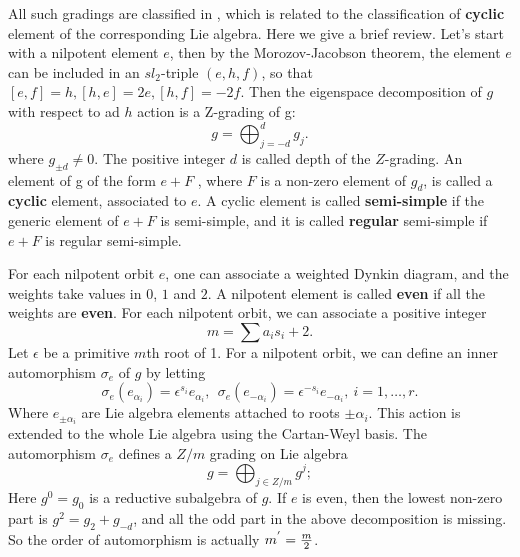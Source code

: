 \documentclass[a4paper,11pt]{article}
\begin{document}
All such gradings are classified in \cite{elashvili2013cyclic}, which is 
related to the classification of \textbf{cyclic} element of the corresponding Lie algebra.
Here we give a brief review. Let's start with a nilpotent element $e$, then 
by the Morozov-Jacobson theorem, the element $e$ can be included in an $sl_2$-triple $(e,h,f)$, so that $[e,f] = h, [h,e] = 2e, [h,f] = -2f$. Then the eigenspace decomposition of $g$ with respect to ad $h$ action is a Z-grading of g:
\begin{equation}
g=\bigoplus_{j=-d}^d g_j.
\end{equation}
where $g_{\pm d}\neq 0$. The positive integer $d$ is called depth of the $Z$-grading. An element of g of the form $e+F$ , where $F$ is a non-zero element of $g_d$, is called a \textbf{cyclic} element, associated to $e$. 
A cyclic element is called \textbf{semi-simple} if the generic element of $e+F$ is semi-simple, and it is called \textbf{regular} semi-simple if $e+F$ is regular semi-simple.  

For each nilpotent orbit $e$, one can associate a weighted Dynkin diagram, and the weights take values in $0$, $1$ and $2$.  
A nilpotent element is called \textbf{even} if all the weights are  \textbf{even}. For each nilpotent orbit,  we can associate a positive integer
\begin{equation}
m={\sum a_i s_i+2}.
\end{equation}
Let $\epsilon$ be a primitive $m$th root of 1. For a nilpotent orbit, we can define an inner automorphism $\sigma_e$ of $g$ by letting 
\begin{equation}
\sigma_e(e_{\alpha_i})=\epsilon^{s_i} e_{\alpha_i},~~\sigma_e(e_{-\alpha_i})=\epsilon^{-s_i} e_{-\alpha_i},~i=1,\ldots,r.
\end{equation}
Where $e_{\pm \alpha_i}$ are Lie algebra elements  attached to roots $\pm \alpha_i$. This action is extended to the whole Lie algebra using the Cartan-Weyl basis. The automorphism $\sigma_e$ defines a $Z/m$ grading on Lie algebra
\begin{equation}
g=\bigoplus_{j\in Z/m} g^j;
\label{decom}
\end{equation}
Here $g^0=g_0$ is a reductive subalgebra of $g$. If $e$ is even, then the lowest non-zero part is
 $g^2=g_2+g_{-d}$, and all the odd part in the above decomposition is missing. So the order of automorphism is actually $m^{'}={m\over 2}$. 
 
\end{document}
